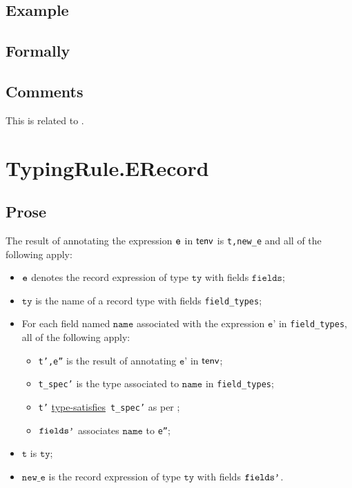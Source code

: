 \documentclass{book}
\newcommand\typesatisfies[0]{\hyperlink{def-typesatisfies}{type-satisfies}}
\newcommand\vt[0]{\texttt{t}}
\newcommand\tty[0]{\texttt{ty}}
\newcommand\fields[0]{\texttt{fields}}
\newcommand\newe[0]{\texttt{new\_e}}
\newcommand\vep[0]{\texttt{e'}}
\newcommand\name[0]{\texttt{name}}
\begin{document}
\subsection{Example}


\begin{emptyformal}
    \subsection{Formally}

\end{emptyformal}

\subsection{Comments}
  This is related to .

\section{TypingRule.ERecord \label{sec:TypingRule.ERecord}}

  \subsection{Prose}
  The result of annotating the expression $\texttt{e}$ in $\textsf{tenv}$ is
\texttt{t,new\_e} and all of the following apply:
  \begin{itemize}
  \item $\texttt{e}$ denotes the record expression of type $\tty$ with fields $\fields$;
  \item $\tty$ is the name of a record type with fields \texttt{field\_types};
  \item For each field named $\name$ associated with the expression $\vep$ in
    \texttt{field\_types}, all of the following apply:
    \begin{itemize}
    \item \texttt{t',e''} is the result of annotating $\vep$ in $\textsf{tenv}$;
    \item \texttt{t\_spec'} is the type associated to $\name$ in \texttt{field\_types};
    \item \texttt{t'} \typesatisfies\  \texttt{t\_spec'} as per ;
    \item $\texttt{fields'}$ associates $\name$ to \texttt{e''};
    \end{itemize}
  \item $\vt$ is $\tty$;
  \item $\newe$ is the record expression of type $\tty$ with fields $\texttt{fields'}$.
  \end{itemize}
\end{document}
